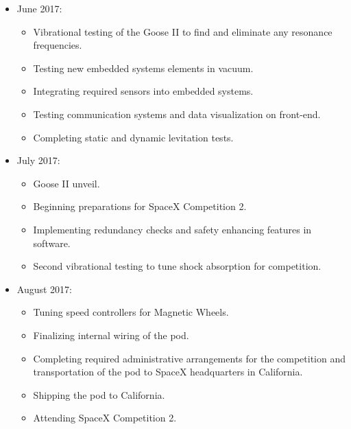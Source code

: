 \documentclass[main.tex]{subfiles}
\begin{document}
\begin{itemize}
\item June 2017:
\begin{itemize}
    \item Vibrational testing of the Goose II to find and eliminate any resonance frequencies.
    \item Testing new embedded systems elements in vacuum.
    \item Integrating required sensors into embedded systems.
    \item Testing communication systems and data visualization on front-end.
    \item Completing static and dynamic levitation tests.
\end{itemize}

\item July 2017:
\begin{itemize}
    \item Goose II unveil.
    \item Beginning preparations for SpaceX Competition 2.
    \item Implementing redundancy checks and safety enhancing features in software.
    \item Second vibrational testing to tune shock absorption for competition.
\end{itemize}

\item August 2017:
\begin{itemize}
    \item Tuning speed controllers for Magnetic Wheels.
    \item Finalizing internal wiring of the pod.
    \item Completing required administrative arrangements for the competition and transportation of the pod to SpaceX headquarters in California.
    \item Shipping the pod to California.
    \item Attending SpaceX Competition 2.
\end{itemize}

\end{itemize}

\end{document}
